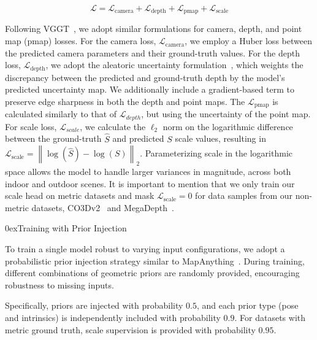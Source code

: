 \documentclass[letterpaper, 10 pt, conference]{ieeeconf}  %
\makeatletter
\renewcommand{\paragraph}{\@startsection{paragraph}{4}{2\parindent}{0ex plus 0.1ex minus 0.1ex}%
{0ex}{\normalfont\normalsize\bfseries}}
\makeatother
\begin{document}
\vspace{-2mm}

\begin{equation}
\mathcal{L} = \mathcal{L}_{\text{camera}} + \mathcal{L}_{\text{depth}} + \mathcal{L}_{\text{pmap}} + \mathcal{L}_{\text{scale}} 
\end{equation}

Following VGGT~\cite{wang2025vggt}, we adopt similar formulations for camera, depth, and point map (pmap) losses. 
For the camera loss, $\mathcal{L}_{\text{camera}}$, we employ a Huber loss between the predicted camera parameters and their ground-truth values. For the depth loss, $\mathcal{L}_{\text{depth}}$, we adopt the aleatoric uncertainty formulation~\cite{kendall2017uncertainties}, which weights the discrepancy between the predicted and ground-truth depth by the model’s predicted uncertainty map. We additionally include a gradient-based term to preserve edge sharpness in both the depth and point maps. The $\mathcal{L}_{\text{pmap}}$ is calculated similarly to that of $\mathcal{L}_{depth}$, but using the uncertainty of the point map.
For scale loss, $\mathcal{L}_{scale}$, we calculate the $\ell_2$ norm on the logarithmic difference between the ground-truth $\hat{S}$ and predicted $S$ scale values, resulting in $ \mathcal{L}_{\text{scale}} = \left\| \log(\hat{S}) - \log(S) \right\|_2 $. 
Parameterizing scale in the logarithmic space allows the model to handle larger variances in magnitude, across both indoor and outdoor scenes. It is important to mention that we only train our scale head on metric datasets and mask $ \mathcal{L}_{\text{scale}} = 0$ for data samples from our non-metric datasets, CO3Dv2~\cite{reizenstein2021common} and MegaDepth~\cite{li2018megadepth}. 


\paragraph{Training with Prior Injection} 

To train a single model robust to varying input configurations, we adopt a probabilistic prior injection strategy similar to MapAnything~\cite{keetha2025mapanything}. During training, different combinations of geometric priors are randomly provided, encouraging robustness to missing inputs.

Specifically, priors are injected with probability $0.5$, and each prior type (pose and intrinsics) is independently included with probability $0.9$. For datasets with metric ground truth, scale supervision is provided with probability $0.95$.
\end{document}
